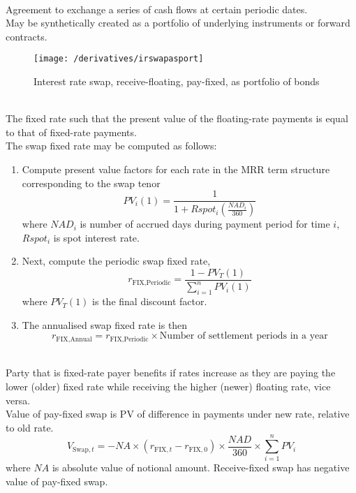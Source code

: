 \begin{remark} \\
Agreement to exchange a series of cash flows at certain periodic dates.\\
May be synthetically created as a portfolio of underlying instruments or forward contracts.
\end{remark}

\begin{figure}[H]
\centering
\texttt{[image: /derivatives/irswapasport]}
\caption{Interest rate swap, receive-floating, pay-fixed, as portfolio of bonds}
\end{figure}

\begin{remark} \\
The fixed rate such that the present value of the floating-rate payments is equal to that of fixed-rate payments.\\
The swap fixed rate may be computed as follows:
\begin{enumerate}[label=\roman*.]
\setlength{\itemsep}{0pt}
\item Compute present value factors for each rate in the MRR term structure corresponding to the swap tenor
\begin{equation}
PV_i(1) = \frac{1}{1 + Rspot_i\left(\frac{NAD_i}{360} \right)} \nonumber
\end{equation}
where $NAD_i$ is number of accrued days during payment period for time $i$, $Rspot_i$ is spot interest rate.
\item Next, compute the periodic swap fixed rate,
\begin{equation}
r_{\text{FIX}, \text{Periodic}} = \frac{1 - PV_T(1)}{\sum\limits_{i=1}^n PV_i(1)} \nonumber 
\end{equation}
where $PV_T(1)$ is the final discount factor.
\item The annualised swap fixed rate is then
\begin{equation}
r_{\text{FIX}, \text{Annual}} = r_{\text{FIX}, \text{Periodic}} \times \text{Number of settlement periods in a year} \nonumber
\end{equation}
\end{enumerate}
\end{remark}

\begin{remark} \\
Party that is fixed-rate payer benefits if rates increase as they are paying the lower (older) fixed rate while receiving the higher (newer) floating rate, vice versa.\\
Value of pay-fixed swap is PV of difference in payments under new rate, relative to old rate.
\begin{equation}
V_{\text{Swap}, t} = - NA \times (r_{\text{FIX},t} - r_{\text{FIX}, 0}) \times \frac{NAD}{360} \times \sum\limits_{i=1}^n PV_i \nonumber
\end{equation}
where $NA$ is absolute value of notional amount. Receive-fixed swap has negative value of pay-fixed swap.
\end{remark}

